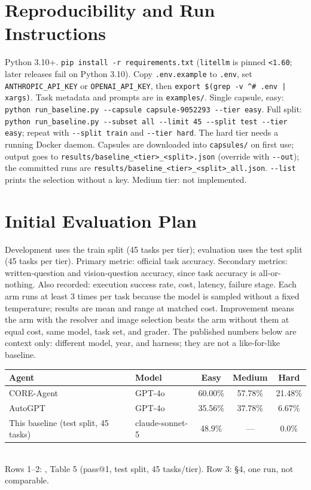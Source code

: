 \documentclass[10pt]{article}
\begin{document}
\section{Reproducibility and Run Instructions}
Python 3.10+. \texttt{pip install -r requirements.txt} (\texttt{litellm} is pinned \texttt{<1.60}; later releases fail on Python 3.10). Copy \texttt{.env.example} to \texttt{.env}, set \texttt{ANTHROPIC\_API\_KEY} or \texttt{OPENAI\_API\_KEY}, then \texttt{export \$(grep -v \textquotesingle\textasciicircum\#\textquotesingle{} .env | xargs)}. Task metadata and prompts are in \texttt{examples/}. Single capsule, easy: \texttt{python run\_baseline.py -{}-capsule capsule-9052293 -{}-tier easy}. Full split: \texttt{python run\_baseline.py -{}-subset all -{}-limit 45 -{}-split test -{}-tier easy}; repeat with \texttt{-{}-split train} and \texttt{-{}-tier hard}. The hard tier needs a running Docker daemon. Capsules are downloaded into \texttt{capsules/} on first use; output goes to \texttt{results/baseline\_<tier>\_<split>.json} (override with \texttt{-{}-out}); the committed runs are \texttt{results/baseline\_<tier>\_<split>\_all.json}. \texttt{-{}-list} prints the selection without a key. Medium tier: not implemented.

\section{Initial Evaluation Plan}
Development uses the train split (45 tasks per tier); evaluation uses the test split (45 tasks per tier). Primary metric: official task accuracy. Secondary metrics: written-question and vision-question accuracy, since task accuracy is all-or-nothing. Also recorded: execution success rate, cost, latency, failure stage. Each arm runs at least 3 times per task because the model is sampled without a fixed temperature; results are mean and range at matched cost. Improvement means the arm with the resolver and image selection beats the arm without them at equal cost, same model, task set, and grader. The published numbers below are context only: different model, year, and harness; they are not a like-for-like baseline.

\begin{center}\scriptsize
\begin{tabular}{@{}llccc@{}}
\toprule
Agent & Model & Easy & Medium & Hard \\
\midrule
CORE-Agent & GPT-4o & 60.00\% & 57.78\% & 21.48\% \\
AutoGPT    & GPT-4o & 35.56\% & 37.78\% & 6.67\%  \\
\midrule
This baseline (test split, 45 tasks) & claude-sonnet-5 & 48.9\% & --- & 0.0\% \\
\bottomrule
\end{tabular}\\[1pt]
{\scriptsize Rows 1--2: \citet{siegel2024corebench}, Table 5 (pass@1, test split, 45 tasks/tier). Row 3: \S4, one run, not comparable.}
\end{center}
\end{document}
